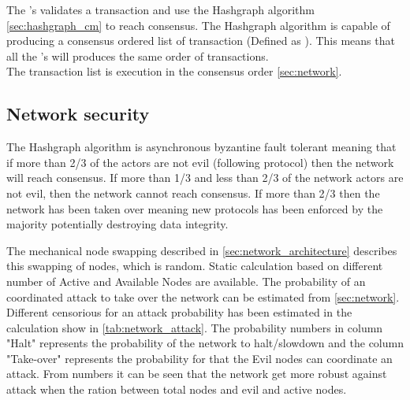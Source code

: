 The 's validates a transaction and use the Hashgraph algorithm \cref{sec:hashgraph_cm} to reach consensus. The Hashgraph algorithm is capable of producing a consensus ordered list of transaction (Defined as ). This means that all the 's will produces the same order of transactions.\\
The transaction list is execution in the consensus order \cref{sec:network}.

\subsection{Network security}

The Hashgraph algorithm is asynchronous byzantine fault tolerant meaning that if more than 2/3 of the actors are not evil (following protocol) then the network will reach consensus. If more than 1/3 and less than 2/3 of the network actors are not evil, then the network cannot reach consensus. If more than 2/3 then the network has been taken over meaning new protocols has been enforced by the majority potentially destroying data integrity. 

The mechanical node swapping described in \cref{sec:network_architecture} describes this swapping of nodes, which is  random. Static calculation based on different number of Active and Available Nodes are available.
The probability of an coordinated attack to take over the network can be estimated from \cref{sec:network}.\\

Different censorious for an attack probability has been estimated in the calculation show in \cref{tab:network_attack}.
The probability numbers in column "Halt" represents the probability of the network to halt/slowdown and the column "Take-over" represents the probability for that the Evil nodes can coordinate an attack.
From numbers it can be seen that the network get more robust against attack when the ration between total nodes and evil and active nodes. 

